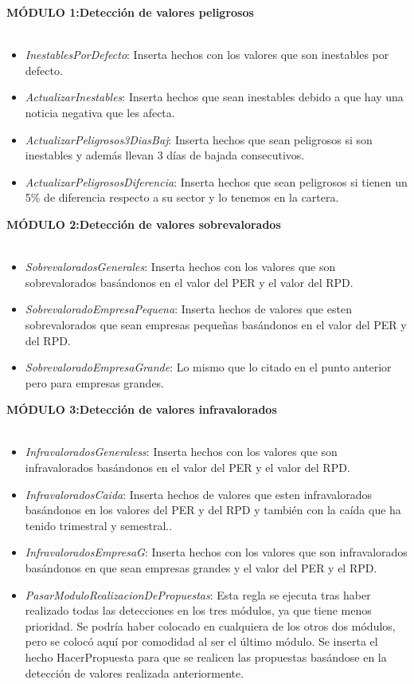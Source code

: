 \textbf{MÓDULO 1:Detección de valores peligrosos}\\\\
\begin{itemize}
	\item \textit{InestablesPorDefecto}: Inserta hechos con los valores que son inestables por defecto.
	\item \textit{ActualizarInestables}: Inserta hechos que sean inestables debido a que hay una noticia negativa que les afecta.
	\item \textit{ActualizarPeligrosos3DiasBaj}: Inserta hechos que sean peligrosos si son inestables y además llevan 3 días de bajada consecutivos.
	\item \textit{ActualizarPeligrososDiferencia}: Inserta hechos que sean peligrosos si tienen un 5\% de diferencia respecto a su sector y lo tenemos en la cartera.\\
\end{itemize}
\textbf{MÓDULO 2:Detección de valores sobrevalorados}\\\\
\begin{itemize}
	\item \textit{SobrevaloradosGenerales}: Inserta hechos con los valores que son sobrevalorados basándonos en el valor del PER y el valor del RPD.
	\item \textit{ SobrevaloradoEmpresaPequena}: Inserta hechos de valores que esten sobrevalorados que sean empresas pequeñas basándonos en el valor del PER y del RPD.
	\item \textit{SobrevaloradoEmpresaGrande}: Lo mismo que lo citado en el punto anterior pero para empresas grandes.\\
\end{itemize}
\textbf{MÓDULO 3:Detección de valores infravalorados}\\\\
\begin{itemize}
	\item \textit{InfravaloradosGeneraless}: Inserta hechos con los valores que son infravalorados basándonos en el valor del PER y el valor del RPD.
	\item \textit{InfravaloradosCaida}: Inserta hechos de valores que esten infravalorados basándonos en los valores del PER y del RPD y también con la caída que ha tenido trimestral y semestral..
	\item \textit{InfravaloradosEmpresaG}: Inserta hechos con los valores que son infravalorados basándonos en que sean empresas grandes y el valor del PER y el RPD.
	\item \textit{PasarModuloRealizacionDePropuestas}: Esta regla se ejecuta tras haber realizado todas las detecciones en los tres módulos, ya que tiene menos prioridad. Se podría haber colocado en cualquiera de los otros dos módulos, pero se colocó aquí por comodidad al ser el último módulo. Se inserta el hecho HacerPropuesta para que se realicen las propuestas basándose en la detección de valores realizada anteriormente.\\
\end{itemize}
